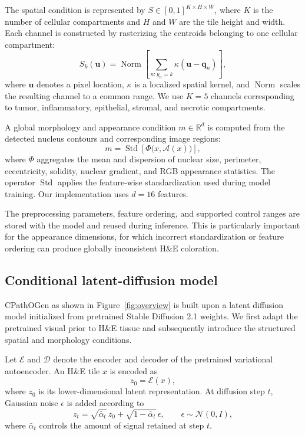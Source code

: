 The spatial condition is represented by
$S\in[0,1]^{K\times H\times W}$, where $K$ is the number of cellular compartments and $H$ and $W$ are the tile height and width. Each channel is constructed by rasterizing the centroids belonging to one cellular compartment:
\begin{equation}
S_k(\mathbf{u})
=
\operatorname{Norm}
\left[
    \sum_{n:y_n=k}
    \kappa(\mathbf{u}-\mathbf{q}_n)
\right],
\label{eq:spatial-map}
\end{equation}
where $\mathbf{u}$ denotes a pixel location, $\kappa$ is a localized spatial kernel, and $\operatorname{Norm}$ scales the resulting channel to a common range. We use $K=5$ channels corresponding to tumor, inflammatory, epithelial, stromal, and necrotic compartments.

A global morphology and appearance condition
$m\in\mathbb{R}^{d}$ is computed from the detected nucleus contours and corresponding image regions:
\begin{equation}
m
=
\operatorname{Std}
\left[
    \Phi\bigl(x,\mathcal{A}(x)\bigr)
\right],
\label{eq:morph-vector}
\end{equation}
where $\Phi$ aggregates the mean and dispersion of nuclear size, perimeter, eccentricity, solidity, nuclear gradient, and RGB appearance statistics. The operator $\operatorname{Std}$ applies the feature-wise standardization used during model training. Our implementation uses $d=16$ features.

The preprocessing parameters, feature ordering, and supported control ranges are stored with the model and reused during inference. This is particularly important for the appearance dimensions, for which incorrect standardization or feature ordering can produce globally inconsistent H\&E coloration.

\subsection{Conditional latent-diffusion model}
\label{sec:conditional-ldm}

CPathOGen as shown in Figure~\ref{fig:overview} is built upon a latent diffusion model initialized from pretrained Stable Diffusion 2.1 weights. We first adapt the pretrained visual prior to H\&E tissue and subsequently introduce the structured spatial and morphology conditions.

Let $\mathcal{E}$ and $\mathcal{D}$ denote the encoder and decoder of the pretrained variational autoencoder. An H\&E tile $x$ is encoded as
\begin{equation}
z_0=\mathcal{E}(x),
\end{equation}
where $z_0$ is its lower-dimensional latent representation. At diffusion step $t$, Gaussian noise $\epsilon$ is added according to
\begin{equation}
z_t
=
\sqrt{\bar{\alpha}_t}\,z_0
+
\sqrt{1-\bar{\alpha}_t}\,\epsilon,
\qquad
\epsilon\sim\mathcal{N}(0,I),
\label{eq:forward-diffusion}
\end{equation}
where $\bar{\alpha}_t$ controls the amount of signal retained at step $t$.

